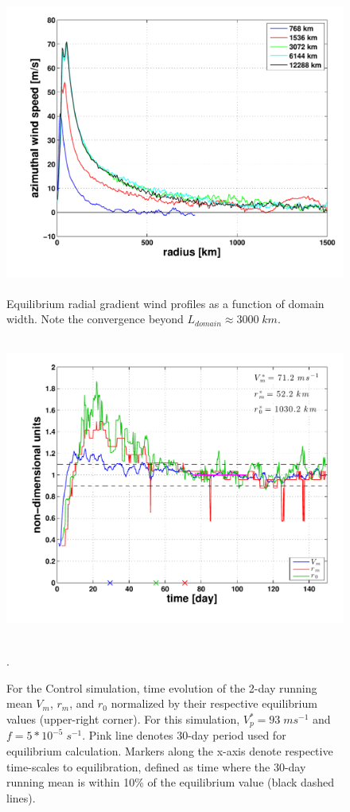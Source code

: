 \documentclass[12pt]{article}
\begin{document}
\begin{figure}[h!]
\centering
  \noindent\includegraphics[width=15cm,height=10cm]{FIGURES_TC_RCE_equilibrium_v2.0/Fig1_Domain_size.pdf}
\caption{Equilibrium radial gradient wind profiles as a function of domain width.  Note the convergence beyond $L_{domain} \approx 3000 \; km$.}
\label{fig:domainsize}
\end{figure}

\begin{figure}[h!]
\centering
  \noindent\includegraphics[width=15cm,height=10cm]{FIGURES_TC_RCE_equilibrium_v2.0/Fig2_Control_run.pdf}
\caption{For the Control simulation, time evolution of the 2-day running mean $V_m$, $r_m$, and $r_0$ normalized by their respective equilibrium values (upper-right corner). For this simulation, $V^*_p =  93 \; ms^{-1}$ and $f = 5*10^{-5} \; s^{-1}$. Pink line denotes 30-day period used for equilibrium calculation. Markers along the x-axis denote respective time-scales to equilibration, defined as time where the 30-day running mean is within 10\% of the equilibrium value (black dashed lines).}
\label{fig:timeseries}.
\end{figure}
\end{document}
